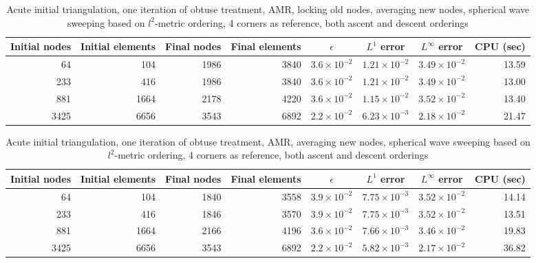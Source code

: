 \documentclass[11pt]{article}
\begin{document}
\begin{table}[h!]
\begin{center}
\begin{tabular}{|r|r|r|r|c|c|c|r|}
\hline
Initial nodes & Initial elements & Final nodes & Final elements & $\epsilon$ & $L^1$ error & $L^\infty$ error & CPU (sec) \\
\hline
64 & 104 & 1986 & 3840 & $3.6 \times 10^{-2}$ & $1.21 \times 10^{-2}$ & $3.49 \times 10^{-2}$ & 13.59 \\
233 & 416 & 1986 & 3840 & $3.6 \times 10^{-2}$ & $1.21 \times 10^{-2}$ & $3.49 \times 10^{-2}$ & 13.00 \\
881 & 1664 & 2178 & 4220 & $3.6 \times 10^{-2}$ & $1.15 \times 10^{-2}$ & $3.52 \times 10^{-2}$ & 13.40 \\
3425 & 6656 & 3543 & 6892 & $2.2 \times 10^{-2}$ & $6.23 \times 10^{-3}$ & $2.18 \times 10^{-2}$ & 21.47 \\
\hline
\end{tabular}
\end{center}
\caption{Acute initial triangulation, one iteration of obtuse treatment, AMR, locking old nodes, averaging new nodes, spherical wave sweeping based on $l^2$-metric ordering, 4 corners as reference, both ascent and descent orderings}
\end{table}

\begin{table}[h!]
\begin{center}
\begin{tabular}{|r|r|r|r|c|c|c|r|}
\hline
Initial nodes & Initial elements & Final nodes & Final elements & $\epsilon$ & $L^1$ error & $L^\infty$ error & CPU (sec) \\
\hline
64 & 104 & 1840 & 3558 & $3.9 \times 10^{-2}$ & $7.75 \times 10^{-3}$ & $3.52 \times 10^{-2}$ & 14.14 \\
233 & 416 & 1846 & 3570 & $3.9 \times 10^{-2}$ & $7.75 \times 10^{-3}$ & $3.52 \times 10^{-2}$ & 13.51 \\
881 & 1664 & 2166 & 4196 & $3.6 \times 10^{-2}$ & $7.66 \times 10^{-3}$ & $3.46 \times 10^{-2}$ & 19.83 \\
3425 & 6656 & 3543 & 6892 & $2.2 \times 10^{-2}$ & $5.82 \times 10^{-3}$ & $2.17 \times 10^{-2}$ & 36.82 \\
\hline
\end{tabular}
\end{center}
\caption{Acute initial triangulation, one iteration of obtuse treatment, AMR, averaging new nodes, spherical wave sweeping based on $l^2$-metric ordering, 4 corners as reference, both ascent and descent orderings}
\end{table}
\end{document}
